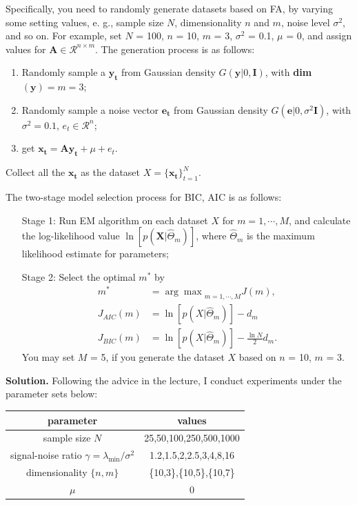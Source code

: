 \documentclass[12pt,a4paper,UTF8,fntef]{article}
\begin{document}
Specifically, you need to randomly generate datasets based on FA, by varying some setting values, e. g., sample size $N$, dimensionality $n$ and $m$, noise level $\sigma^2$, and so on. For example, set $N$ = 100, $n$ = 10, $m$ = 3, $\sigma^2$ = 0.1, $\mu$ = 0, and assign values for $\mathbf{A} \in \mathcal{R}^{n\times m}$. The generation process is as follows:
\begin{enumerate}
	\item Randomly sample a $\mathbf{y_t}$ from Gaussian density $G(\mathbf{y}|0,\mathbf{I})$, with \textbf{dim}$(\mathbf{y}) = m=3$;
	\item Randomly sample a noise vector $\mathbf{e_t}$ from Gaussian density $G(\mathbf{e}|0,\sigma^2\mathbf{I})$, with $\sigma^2=0.1$, $e_t\in\mathcal{R}^n$;
	\item get $\mathbf{x_t}=\mathbf{Ay_t}+\mu+e_t$.
\end{enumerate}

Collect all the $\mathbf{x_t}$ as the dataset $X=\{\mathbf{x_t}\}_{t=1}^N$.

The two-stage model selection process for BIC, AIC is as follows:
\begin{enumerate}
	\item[Stage 1:] Run EM algorithm on each dataset $X$ for $m = 1, \cdots, M$, and calculate the log-likelihood
	value $\ln[p(\mathbf{X}|\hat{\Theta}_m)]$, where $\hat{\Theta}_m$ is the maximum likelihood estimate for parameters; 
	\item[Stage 2:] Select the optimal $m^*$ by
	\begin{align}
		m^*&={\arg\max}_{m=1,\cdots,M}J(m),\\
		J_{AIC}(m)&=\ln[p(X|\hat{\Theta}_m)]-d_m \\
		J_{BIC}(m)&=\ln[p(X|\hat{\Theta}_m)]-\frac{\ln N}{2}d_m.
	\end{align}
	You may set $M$ = 5, if you generate the dataset $X$ based on $n$ = 10, $m$ = 3.
\end{enumerate}

\textbf{Solution.} Following the advice in the lecture, I conduct experiments under the parameter sets below:
\begin{table}[!h]
	\centering
	\begin{tabular}{|c|c|}
		\hline
		parameter & values \\
		\hline
		sample size $N$ & {25,50,100,250,500,1000}\\
		\hline
		signal-noise ratio $\gamma=\lambda_{\min}/\sigma^2$ & 1.2,1.5,2,2.5,3,4,8,16\\
		\hline
		dimensionality $\{n,m\}$ & \{10,3\},\{10,5\},\{10,7\}\\
		\hline
		$\mu$ & 0 \\
		\hline
	\end{tabular}
\end{table}
\end{document}
